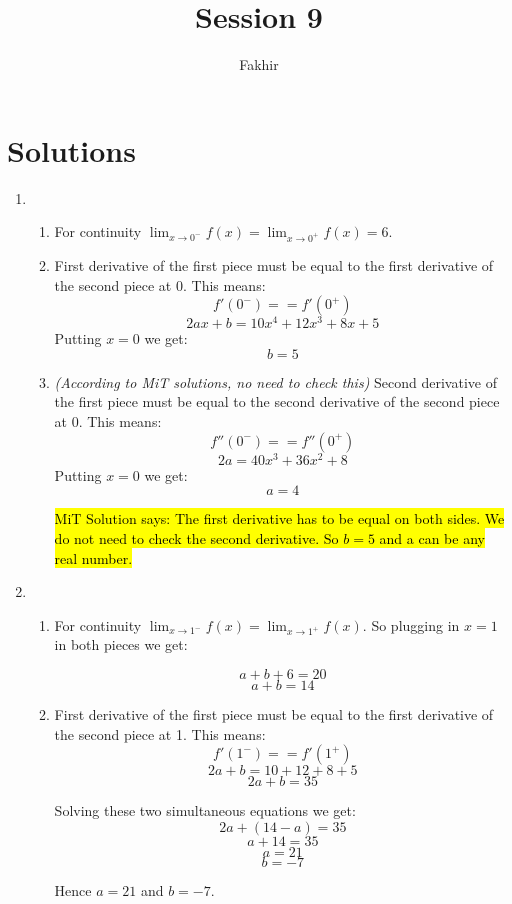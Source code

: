 \documentclass[]{article}
\title{Session 9}
\author{Fakhir}
\DeclareRobustCommand{\hlred}[1]{{\sethlcolor{red}\hl{#1}}}
\begin{document}
\maketitle

\section*{Solutions}

\begin{enumerate}
	\item \begin{enumerate}
		\item For continuity $\lim_{x\to0^{-}} f(x) = \lim_{x\to0^{+}} f(x) = 6$.
		\item First derivative of the first piece must be equal to the first derivative of the second piece at 0. This means:
		$$ f'(0^{-}) == f'(0^{+})$$
		$$ 2ax + b = 10x^{4}+12x^{3}+8x+5 $$
		Putting $x = 0$ we get:
		$$b = 5$$
		\item \textit{(According to MiT solutions, no need to check this)} Second derivative of the first piece must be equal to the second derivative of the second piece at 0. This means:
		$$ f''(0^{-}) == f''(0^{+})$$
		$$ 2a = 40x^{3}+36x^{2}+8 $$
		Putting $x = 0$ we get:
		$$a = 4$$
		
		\hlred{MiT Solution says: The first derivative has to be equal on both sides. We do not need to check the second derivative. So $b=5$ and a can be any real number.}
	\end{enumerate}
	
	\item \begin{enumerate}
		\item For continuity $\lim_{x\to1^{-}} f(x) = \lim_{x\to1^{+}} f(x)$. So plugging in $x=1$ in both pieces we get:
		
		$$ a+b+6 = 20 $$
		$$ a+b = 14 $$
		\item First derivative of the first piece must be equal to the first derivative of the second piece at 1. This means:
		$$ f'(1^{-}) == f'(1^{+})$$
		$$ 2a+b = 10+12+8+5 $$
		$$ 2a+b = 35 $$
	
		Solving these two simultaneous equations we get:
		$$ 2a + (14-a) = 35 $$
		$$ a + 14 = 35 $$
		$$ a = 21 $$
		$$ b = -7 $$
	
		Hence $a=21$ and $b=-7$.
	
	\end{enumerate}
	
\end{enumerate}
\end{document}
